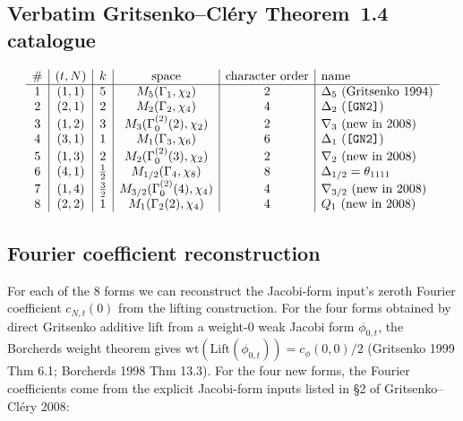 \subsection*{Verbatim Gritsenko--Cl\'ery Theorem~1.4 catalogue}

\[
\begin{array}{c|c|c|c|c|l}
 \# & (t, N) & k & \text{space} & \text{character order} & \text{name} \\ \hline
 1 & (1, 1) & 5 & M_5(\Gamma_1, \chi_2) & 2 & \Delta_5 \text{ (Gritsenko 1994)} \\
 2 & (2, 1) & 2 & M_2(\Gamma_2, \chi_4) & 4 & \Delta_2 \text{ (\texttt{[GN2]})} \\
 3 & (1, 2) & 3 & M_3(\Gamma_0^{(2)}(2), \chi_2) & 2 & \nabla_3 \text{ (new in 2008)} \\
 4 & (3, 1) & 1 & M_1(\Gamma_3, \chi_6) & 6 & \Delta_1 \text{ (\texttt{[GN2]})} \\
 5 & (1, 3) & 2 & M_2(\Gamma_0^{(2)}(3), \chi_2) & 2 & \nabla_2 \text{ (new in 2008)} \\
 6 & (4, 1) & \tfrac{1}{2} & M_{1/2}(\Gamma_4, \chi_8) & 8 & \Delta_{1/2} = \theta_{1111} \\
 7 & (1, 4) & \tfrac{3}{2} & M_{3/2}(\Gamma_0^{(2)}(4), \chi_4) & 4 & \nabla_{3/2} \text{ (new in 2008)} \\
 8 & (2, 2) & 1 & M_1(\Gamma_2(2), \chi_4) & 4 & Q_1 \text{ (new in 2008)} \\
\end{array}
\]

\subsection*{Fourier coefficient reconstruction}

For each of the 8 forms we can reconstruct the Jacobi-form input's
zeroth Fourier coefficient $c_{N, t}(0)$ from the lifting construction.
For the four forms obtained by direct Gritsenko additive lift from a
weight-$0$ weak Jacobi form $\phi_{0, t}$, the Borcherds weight theorem
gives $\mathrm{wt}(\mathrm{Lift}(\phi_{0, t})) = c_\phi(0, 0)/2$
(Gritsenko 1999 Thm 6.1; Borcherds 1998 Thm 13.3). For the four new
forms, the Fourier coefficients come from the explicit Jacobi-form
inputs listed in \S 2 of Gritsenko--Cl\'ery 2008:

